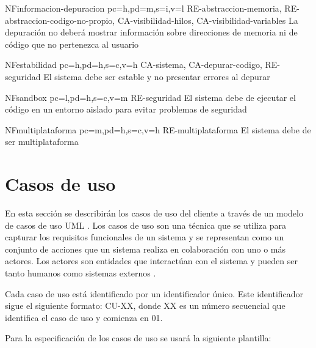 \begin{softwareReq}{NF}{informacion-depuracion}
    {pc=h,pd=m,s=i,v=l}
    {RE-abstraccion-memoria, RE-abstraccion-codigo-no-propio, CA-visibilidad-hilos, CA-visibilidad-variables}
    La depuración no deberá mostrar información sobre direcciones de memoria ni de código que no pertenezca al usuario
\end{softwareReq}

\begin{softwareReq}{NF}{estabilidad}
    {pc=h,pd=h,s=c,v=h}
    {CA-sistema, CA-depurar-codigo, RE-seguridad}
    El sistema debe ser estable y no presentar errores al depurar
\end{softwareReq}

\begin{softwareReq}{NF}{sandbox}
    {pc=l,pd=h,s=c,v=m}
    {RE-seguridad}
    El sistema debe de ejecutar el código en un entorno aislado para evitar problemas de seguridad
\end{softwareReq}

\begin{softwareReq}{NF}{multiplataforma}
    {pc=m,pd=h,s=c,v=h}
    {RE-multiplataforma}
    El sistema debe de ser multiplataforma
\end{softwareReq}

\FloatBarrier

\section{Casos de uso}\label{sec:casos-de-uso}

En esta sección se describirán los casos de uso del cliente a través de un modelo de casos de uso UML \cite{UML-UseCases}. Los casos de uso son una técnica que se utiliza para capturar los requisitos funcionales de un sistema y se representan como un conjunto de acciones que un sistema realiza en colaboración con uno o más actores. Los actores son entidades que interactúan con el sistema y pueden ser tanto humanos como sistemas externos \cite{UseCases-Wikipedia}.

Cada caso de uso está identificado por un identificador único. Este identificador sigue el siguiente formato: CU-XX, donde XX es un número secuencial que identifica el caso de uso y comienza en 01.


Para la especificación de los casos de uso se usará la siguiente plantilla:

